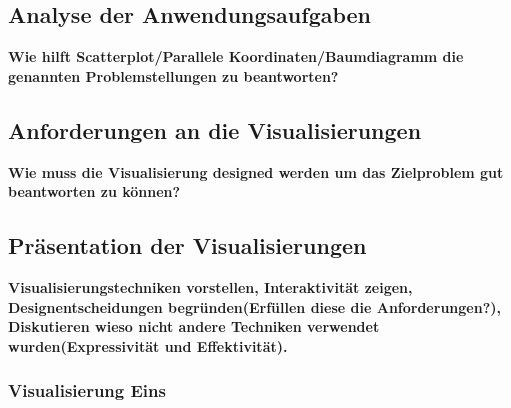 \documentclass[usegeometry=true]{scrartcl}
\begin{document}
\subsection{Analyse der Anwendungsaufgaben}

\textbf{Wie hilft Scatterplot/Parallele Koordinaten/Baumdiagramm die genannten Problemstellungen zu beantworten?}
\subsection{Anforderungen an die Visualisierungen}
\textbf{Wie muss die Visualisierung designed werden um das Zielproblem gut beantworten zu können?}
\subsection{Präsentation der Visualisierungen}


\textbf{Visualisierungstechniken vorstellen, Interaktivität zeigen, Designentscheidungen begründen(Erfüllen diese die Anforderungen?), Diskutieren wieso nicht andere Techniken verwendet wurden(Expressivität und Effektivität).}
\subsubsection{Visualisierung Eins}
\end{document}
